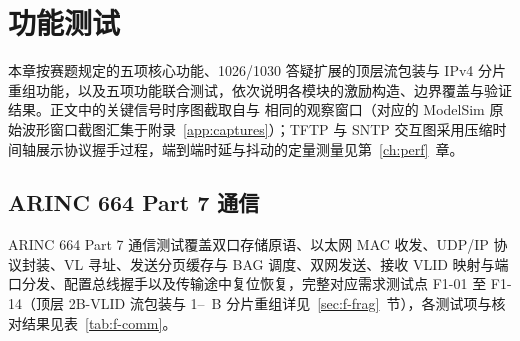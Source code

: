\chapter{功能测试}\label{ch:func}

本章按赛题规定的五项核心功能、1026/1030 答疑扩展的顶层流包装与 IPv4 分片重组功能，以及五项功能联合测试，依次说明各模块的激励构造、边界覆盖与验证结果。正文中的关键信号时序图截取自与  相同的观察窗口（对应的 ModelSim 原始波形窗口截图汇集于附录~\ref{app:captures}）；TFTP 与 SNTP 交互图采用压缩时间轴展示协议握手过程，端到端时延与抖动的定量测量见第~\ref{ch:perf}~章。

\section{ARINC 664 Part 7 通信}\label{sec:f-comm}

ARINC 664 Part 7 通信测试覆盖双口存储原语、以太网 MAC 收发、UDP/IP 协议封装、VL 寻址、发送分页缓存与 BAG 调度、双网发送、接收 VLID 映射与端口分发、配置总线握手以及传输途中复位恢复，完整对应需求测试点 F1-01 至 F1-14（顶层 2B-VLID 流包装与 1--\MaxMessageBytes{}~B 分片重组详见~\ref{sec:f-frag}~节），各测试项与核对结果见表~\ref{tab:f-comm}。

